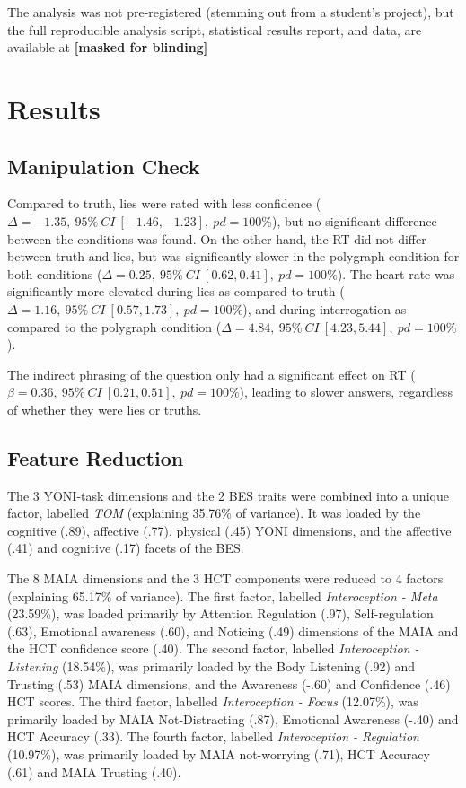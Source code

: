\documentclass[
  man,mask,floatsintext]{apa6}
\begin{document}
The analysis was not pre-registered (stemming out from a student's project), but the full reproducible analysis script, statistical results report, and data, are available at
\textbf{{[}masked for blinding{]}}

\hypertarget{results}{%
\section{Results}\label{results}}

\hypertarget{manipulation-check}{%
\subsection{Manipulation Check}\label{manipulation-check}}

Compared to truth, lies were rated with less confidence (\(\Delta=-1.35,~95\%~CI~[-1.46, -1.23],~pd = 100\%\)), but no significant difference between the conditions was found. On the other hand, the RT did not differ between truth and lies, but was significantly slower in the polygraph condition for both conditions (\(\Delta=0.25,~95\%~CI~[0.62, 0.41],~pd = 100\%\)). The heart rate was significantly more elevated during lies as compared to truth (\(\Delta=1.16,~95\%~CI~[0.57, 1.73],~pd = 100\%\)), and during interrogation as compared to the polygraph condition (\(\Delta=4.84 ,~95\%~CI~[4.23, 5.44],~pd = 100\%\)).

The indirect phrasing of the question only had a significant effect on RT (\(\beta=0.36,~95\%~CI~[0.21, 0.51],~pd = 100\%\)), leading to slower answers, regardless of whether they were lies or truths.

\hypertarget{feature-reduction}{%
\subsection{Feature Reduction}\label{feature-reduction}}

The 3 YONI-task dimensions and the 2 BES traits were combined into a unique factor, labelled \emph{TOM} (explaining 35.76\% of variance). It was loaded by the cognitive (.89), affective (.77), physical (.45) YONI dimensions, and the affective (.41) and cognitive (.17) facets of the BES.

The 8 MAIA dimensions and the 3 HCT components were reduced to 4 factors (explaining 65.17\% of variance). The first factor, labelled \emph{Interoception - Meta} (23.59\%), was loaded primarily by Attention Regulation (.97), Self-regulation (.63), Emotional awareness (.60), and Noticing (.49) dimensions of the MAIA and the HCT confidence score (.40). The second factor, labelled \emph{Interoception - Listening} (18.54\%), was primarily loaded by the Body Listening (.92) and Trusting (.53) MAIA dimensions, and the Awareness (-.60) and Confidence (.46) HCT scores. The third factor, labelled \emph{Interoception - Focus} (12.07\%), was primarily loaded by MAIA Not-Distracting (.87), Emotional Awareness (-.40) and HCT Accuracy (.33). The fourth factor, labelled \emph{Interoception - Regulation} (10.97\%), was primarily loaded by MAIA not-worrying (.71), HCT Accuracy (.61) and MAIA Trusting (.40).
\end{document}
